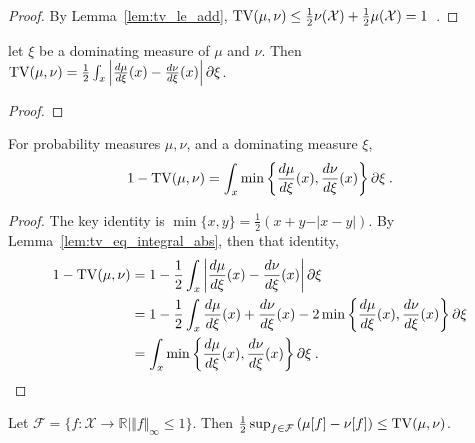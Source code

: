 \begin{proof}
By Lemma~\ref{lem:tv_le_add}, $\operatorname{TV}(\mu, \nu) \le \frac{1}{2}\nu(\mathcal X) + \frac{1}{2}\mu(\mathcal X) = 1$~.
\end{proof}

\begin{lemma}
  \label{lem:tv_eq_integral_abs}
  let $\xi$ be a dominating measure of $\mu$ and $\nu$. Then
  $\operatorname{TV}(\mu, \nu) = \frac{1}{2}\int_x \left\vert \frac{d\mu}{d\xi}(x) - \frac{d\nu}{d\xi}(x) \right\vert \partial\xi$.
\end{lemma}

\begin{proof}%
\end{proof}

\begin{lemma}
  \label{lem:one_sub_tv_eq_integral_min}
  For probability measures $\mu, \nu$, and a dominating measure $\xi$,
  \begin{align*}
  1 - \operatorname{TV}(\mu, \nu)
  = \int_x \min\left\{ \frac{d\mu}{d\xi}(x), \frac{d\nu}{d\xi}(x)\right\}\partial \xi
  \: .
  \end{align*}
\end{lemma}

\begin{proof}%
{}
The key identity is $\min\{x, y\} = \frac{1}{2}\left(x + y - \vert x - y \vert\right)$.
By Lemma~\ref{lem:tv_eq_integral_abs}, then that identity,
\begin{align*}
1 - \operatorname{TV}(\mu, \nu)
&= 1 - \frac{1}{2}\int_x \left\vert \frac{d\mu}{d\xi}(x) - \frac{d\nu}{d\xi}(x)\right\vert \partial \xi
\\
&= 1 - \frac{1}{2}\int_x \frac{d\mu}{d\xi}(x) + \frac{d\nu}{d\xi}(x) - 2\min\left\{ \frac{d\mu}{d\xi}(x), \frac{d\nu}{d\xi}(x)\right\} \partial \xi
\\
&= \int_x \min\left\{ \frac{d\mu}{d\xi}(x), \frac{d\nu}{d\xi}(x)\right\}\partial \xi
\: .
\end{align*}
\end{proof}

\begin{lemma}
  \label{lem:tv_eq_sup_aux}
  Let $\mathcal F = \{f : \mathcal X \to \mathbb{R} \mid \Vert f \Vert_\infty \le 1\}$.
  Then $\frac{1}{2} \sup_{f \in \mathcal F} \left( \mu[f] - \nu[f] \right) \le \operatorname{TV}(\mu, \nu)$.
\end{lemma}


